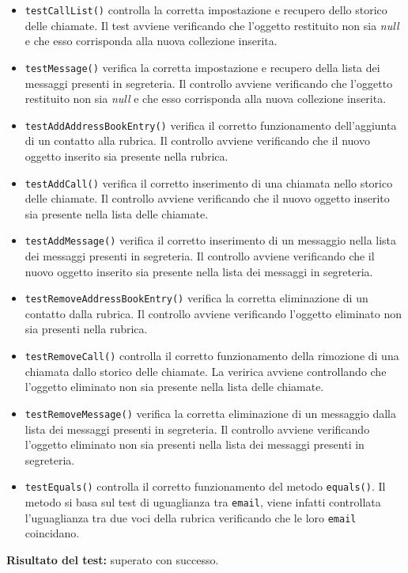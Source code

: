 \begin{itemize}
\begin{itemize}
\item \texttt{testCallList()} controlla la corretta impostazione e recupero dello storico delle chiamate.
Il test avviene verificando che l'oggetto restituito non sia \textit{null} e che esso corrisponda alla nuova collezione inserita.
\item \texttt{testMessage()} verifica la corretta impostazione e recupero della lista dei messaggi presenti in segreteria.
Il controllo avviene verificando che l'oggetto restituito non sia \textit{null} e che esso corrisponda alla nuova collezione inserita.
\item \texttt{testAddAddressBookEntry()} verifica il corretto funzionamento dell'aggiunta di un contatto alla rubrica.
Il controllo avviene verificando che il nuovo oggetto inserito sia presente nella rubrica.
\item \texttt{testAddCall()} verifica il corretto inserimento di una chiamata nello storico delle chiamate.
Il controllo avviene verificando che il nuovo oggetto inserito sia presente nella lista delle chiamate. 
\item \texttt{testAddMessage()}  verifica il corretto inserimento di un messaggio nella lista dei messaggi presenti in segreteria.
Il controllo avviene verificando che il nuovo oggetto inserito sia presente nella lista dei messaggi in segreteria. 

\item \texttt{testRemoveAddressBookEntry()} verifica la corretta eliminazione di un contatto dalla rubrica.
Il controllo avviene verificando l'oggetto eliminato non sia presenti nella rubrica.  

\item \texttt{testRemoveCall()} controlla il corretto funzionamento della rimozione di una chiamata dallo storico delle chiamate. La veririca avviene controllando che l'oggetto eliminato non sia presente nella lista delle chiamate.

\item \texttt{testRemoveMessage()} verifica la corretta eliminazione di un messaggio dalla lista dei messaggi presenti in segreteria.
Il controllo avviene verificando l'oggetto eliminato non sia presenti nella lista dei messaggi presenti in segreteria. 
\item \texttt{testEquals()} controlla  il corretto funzionamento del metodo \texttt{equals()}. Il metodo si basa sul test di uguaglianza tra \texttt{email}, viene infatti controllata l'uguaglianza tra due voci della rubrica verificando che le loro \texttt{email} coincidano. 

\end{itemize}
\textbf{Risultato del test:} superato con successo.
\end{itemize}

